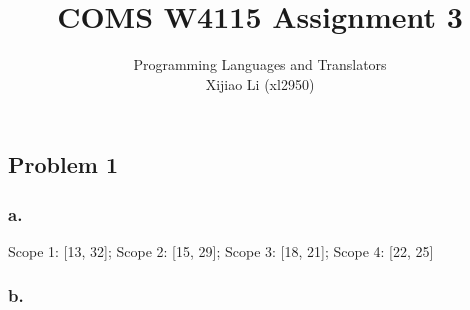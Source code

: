 \documentclass{article}
\title{COMS W4115
	Assignment 3}
\author{Programming Languages and Translators\medskip\\
	Xijiao Li (xl2950)}
\begin{document}
	
	\maketitle
	
	\newpage
	\subsection*{Problem 1}
	\subsubsection*{a.}
	Scope 1: [13, 32]; Scope 2: [15, 29]; Scope 3: [18, 21]; Scope 4: [22, 25]
	
	\subsubsection*{b.}
\end{document}
